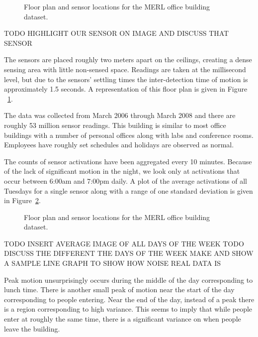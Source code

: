\begin{figure}[!ht]
	\begin{center}
	\end{center}
	\caption{Floor plan and sensor locations for the MERL office building dataset.}
	\label{fig:merlfloor}
\end{figure}

TODO HIGHLIGHT OUR SENSOR ON IMAGE AND DISCUSS THAT SENSOR

The sensors are placed roughly two meters apart on the ceilings, creating a dense sensing area with little non-sensed space.  Readings are taken at the millisecond level, but due to the sensors' settling times the inter-detection time of motion is approximately 1.5 seconds.  A representation of this floor plan is given in Figure ~\ref{fig:merlfloor}.

The data was collected from March 2006 through March 2008 and there are roughly 53 million sensor readings.  This building is similar to most office buildings with a number of personal offices along with labs and conference rooms.  Employees have roughly set schedules and holidays are observed as normal. 

The counts of sensor activations have been aggregated every 10 minutes.  Because of the lack of significant motion in the night, we look only at activations that occur between 6:00am and 7:00pm daily.  A plot of the average activations of all Tuesdays for a single sensor along with a range of one standard deviation is given in Figure~\ref{fig:merl_day_raw}.  

\begin{figure}[!ht]
	\begin{center}
	\end{center}
	\caption{Floor plan and sensor locations for the MERL office building dataset.}
	\label{fig:merl_day_raw}
\end{figure}


TODO INSERT AVERAGE IMAGE OF ALL DAYS OF THE WEEK
TODO DISCUSS THE DIFFERENT THE DAYS OF THE WEEK MAKE AND SHOW A SAMPLE LINE GRAPH TO SHOW HOW NOISE REAL DATA IS

Peak motion unsurprisingly occurs during the middle of the day corresponding to lunch time.  There is another small peak of motion near the start of the day corresponding to people entering.  Near the end of the day, instead of a peak there is a region corresponding to high variance.  This seems to imply that while people enter at roughly the same time, there is a significant variance on when people leave the building.


